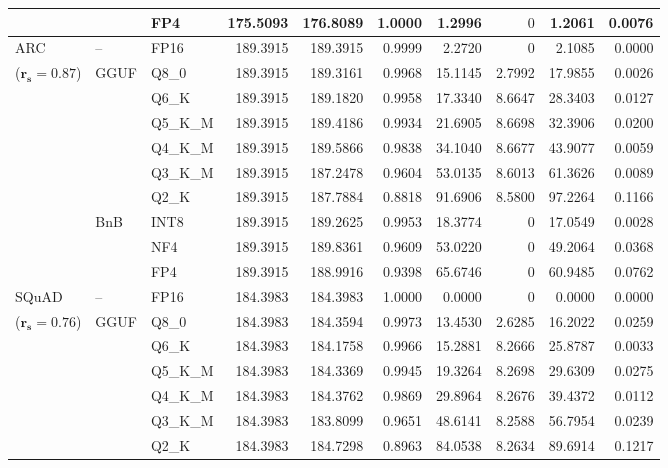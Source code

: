 \begin{longtable}{ll l rrrrrrr}
 &  & FP4 & 175.5093 & 176.8089 & 1.0000 & 1.2996 & \cellcolor{cyan!12} $0$ & 1.2061 & 0.0076 \\
\midrule
ARC & -- & FP16 & 189.3915 & 189.3915 & 0.9999 & 2.2720 & \cellcolor{cyan!12} $0$ & 2.1085 & 0.0000 \\
{\small ($\mathbf{r_s{=}0.87}$)} & GGUF & Q8\_0 & 189.3915 & 189.3161 & 0.9968 & 15.1145 & 2.7992 & 17.9855 & 0.0026 \\
 &  & Q6\_K & 189.3915 & 189.1820 & 0.9958 & 17.3340 & 8.6647 & 28.3403 & 0.0127 \\
 &  & Q5\_K\_M & 189.3915 & 189.4186 & 0.9934 & 21.6905 & 8.6698 & 32.3906 & 0.0200 \\
 &  & Q4\_K\_M & 189.3915 & 189.5866 & 0.9838 & 34.1040 & 8.6677 & 43.9077 & 0.0059 \\
 &  & Q3\_K\_M & 189.3915 & 187.2478 & 0.9604 & 53.0135 & 8.6013 & 61.3626 & 0.0089 \\
 &  & Q2\_K & 189.3915 & 187.7884 & \cellcolor{red!18} 0.8818 & \cellcolor{red!18} 91.6906 & 8.5800 & \cellcolor{red!18} 97.2264 & \cellcolor{red!18} 0.1166 \\
 & BnB & INT8 & 189.3915 & 189.2625 & 0.9953 & 18.3774 & \cellcolor{cyan!12} $0$ & 17.0549 & 0.0028 \\
 &  & NF4 & 189.3915 & 189.8361 & 0.9609 & 53.0220 & \cellcolor{cyan!12} $0$ & 49.2064 & 0.0368 \\
 &  & FP4 & 189.3915 & 188.9916 & \cellcolor{red!18} 0.9398 & \cellcolor{red!18} 65.6746 & \cellcolor{cyan!12} $0$ & \cellcolor{red!18} 60.9485 & \cellcolor{red!18} 0.0762 \\
\midrule
SQuAD & -- & FP16 & 184.3983 & 184.3983 & 1.0000 & 0.0000 & \cellcolor{cyan!12} $0$ & 0.0000 & 0.0000 \\
{\small ($\mathbf{r_s{=}0.76}$)} & GGUF & Q8\_0 & 184.3983 & 184.3594 & 0.9973 & 13.4530 & 2.6285 & 16.2022 & 0.0259 \\
 &  & Q6\_K & 184.3983 & 184.1758 & 0.9966 & 15.2881 & 8.2666 & 25.8787 & 0.0033 \\
 &  & Q5\_K\_M & 184.3983 & 184.3369 & 0.9945 & 19.3264 & 8.2698 & 29.6309 & 0.0275 \\
 &  & Q4\_K\_M & 184.3983 & 184.3762 & 0.9869 & 29.8964 & 8.2676 & 39.4372 & 0.0112 \\
 &  & Q3\_K\_M & 184.3983 & 183.8099 & 0.9651 & 48.6141 & 8.2588 & 56.7954 & 0.0239 \\
 &  & Q2\_K & 184.3983 & 184.7298 & \cellcolor{red!18} 0.8963 & \cellcolor{red!18} 84.0538 & 8.2634 & \cellcolor{red!18} 89.6914 & \cellcolor{red!18} 0.1217 \\

\end{longtable}
